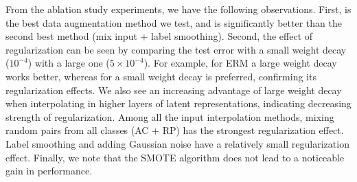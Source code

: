 From the ablation study experiments, we have the following observations. First, \mixup{} is the best data augmentation method we test, and is significantly better than the second best method (mix input + label smoothing). Second, the effect of regularization can be seen by comparing the test error with a small weight decay ($10^{-4}$) with a large one ($5\times 10^{-4}$). For example, for ERM a large weight decay works better, whereas for \mixup{} a small weight decay is preferred, confirming its regularization effects. We also see an increasing advantage of large weight decay when interpolating in higher layers of latent representations, indicating decreasing strength of regularization.
Among all the input interpolation methods, mixing random pairs from all classes (AC + RP) has the strongest regularization effect. Label smoothing and adding Gaussian noise have a relatively small regularization effect. Finally, we note that the SMOTE algorithm \citep{chawla2002smote} does not lead to a noticeable gain in performance.
